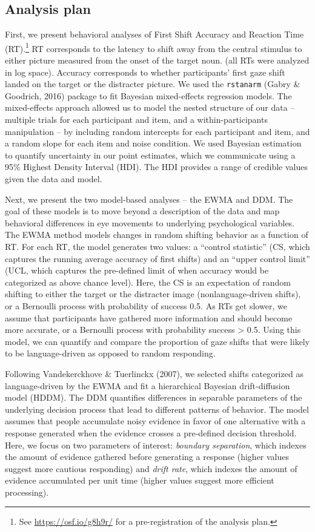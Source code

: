 \documentclass[10pt, letterpaper]{article}
\begin{document}
\subsection{Analysis plan}\label{analysis-plan}

First, we present behavioral analyses of First Shift Accuracy and
Reaction Time (RT).\footnote{See \url{https://osf.io/g8h9r/} for a
  pre-registration of the analysis plan.} RT corresponds to the latency
to shift away from the central stimulus to either picture measured from
the onset of the target noun. (all RTs were analyzed in log space).
Accuracy corresponds to whether participants' first gaze shift landed on
the target or the distracter picture. We used the \texttt{rstanarm}
(Gabry \& Goodrich, 2016) package to fit Bayesian mixed-effects
regression models. The mixed-effects approach allowed us to model the
nested structure of our data -- multiple trials for each participant and
item, and a within-participants manipulation -- by including random
intercepts for each participant and item, and a random slope for each
item and noise condition. We used Bayesian estimation to quantify
uncertainty in our point estimates, which we communicate using a 95\%
Highest Density Interval (HDI). The HDI provides a range of credible
values given the data and model.

Next, we present the two model-based analyses -- the EWMA and DDM. The
goal of these models is to move beyond a description of the data and map
behavioral differences in eye movements to underlying psychological
variables. The EWMA method models changes in random shifting behavior as
a function of RT. For each RT, the model generates two values: a
``control statistic'' (CS, which captures the running average accuracy
of first shifts) and an ``upper control limit'' (UCL, which captures the
pre-defined limit of when accuracy would be categorized as above chance
level). Here, the CS is an expectation of random shifting to either the
target or the distracter image (nonlanguage-driven shifts), or a
Bernoulli process with probability of success 0.5. As RTs get slower, we
assume that participants have gathered more information and should
become more accurate, or a Bernoulli process with probability success
\textgreater{} 0.5. Using this model, we can quantify and compare the
proportion of gaze shifts that were likely to be language-driven as
opposed to random responding.

Following Vandekerckhove \& Tuerlinckx (2007), we selected shifts
categorized as language-driven by the EWMA and fit a hierarchical
Bayesian drift-diffusion model (HDDM). The DDM quantifies differences in
separable parameters of the underlying decision process that lead to
different patterns of behavior. The model assumes that people accumulate
noisy evidence in favor of one alternative with a response generated
when the evidence crosses a pre-defined decision threshold. Here, we
focus on two parameters of interest: \emph{boundary separation}, which
indexes the amount of evidence gathered before generating a response
(higher values suggest more cautious responding) and \emph{drift rate},
which indexes the amount of evidence accumulated per unit time (higher
values suggest more efficient processing).
\end{document}
